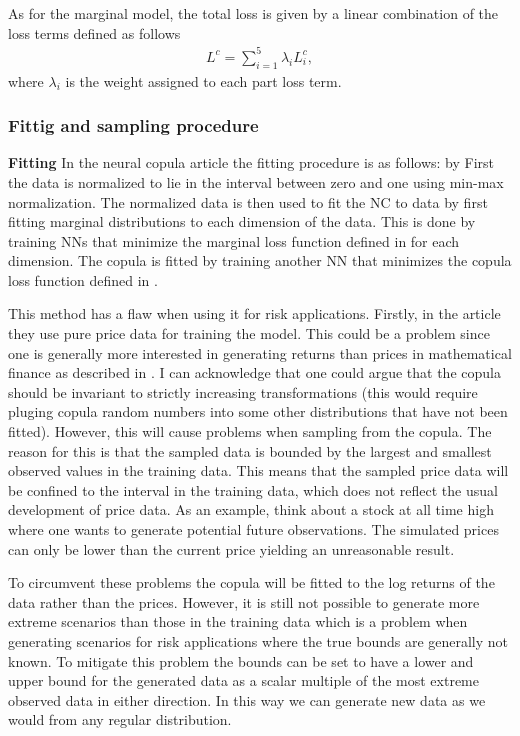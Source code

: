 As for the marginal model, the total loss is given by a linear combination of the loss terms defined as follows
\begin{align*}
    L^c = \sum_{i=1}^5 \lambda_i L_i^c,
\end{align*}
where $\lambda_i$ is the weight assigned to each part loss term. 


\subsubsection{Fittig and sampling procedure}\label{sec:NeuralCopulaFittingAndSampling}
\textbf{Fitting}
In the neural copula article the fitting procedure is as follows: by 
First the data is normalized to lie in the interval between zero and one using min-max normalization. The normalized data is then used to fit the \gls{NC} to data by first fitting marginal distributions to each dimension of the data. This is done by training \gls{NN}s that minimize the marginal loss function defined in  for each dimension. The copula is fitted by training another \gls{NN} that minimizes the copula loss function defined in . 

\begin{generalinstructions}
    This method has a flaw when using it for risk applications. Firstly, in the article they use pure price data for training the model. This could be a problem since one is generally more interested in generating returns than prices in mathematical finance as described in . I can acknowledge that one could argue that the copula should be invariant to strictly increasing transformations (this would require pluging copula random numbers into some other distributions that have not been fitted). However, this will cause problems when sampling from the copula. The reason for this is that the sampled data is bounded by the largest and smallest observed values in the training data. This means that the sampled price data will be confined to the interval in the training data, which does not reflect the usual development of price data. As an example, think about a stock at all time high where one wants to generate potential future observations. The simulated prices can only be lower than the current price yielding an unreasonable result. 
    
    To circumvent these problems the copula will be fitted to the log returns of the data rather than the prices. However, it is still not possible to generate more extreme scenarios than those in the training data which is a problem when generating scenarios for risk applications where the true bounds are generally not known. To mitigate this problem the bounds can be set to have a lower and upper bound for the generated data as a scalar multiple of the most extreme observed data in either direction. In this way we can generate new data as we would from any regular distribution. 
\end{generalinstructions}


